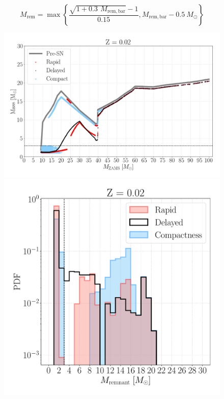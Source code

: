\documentclass[a4paper,titlepage]{book}     	%
\newcommand{\sun}{\ensuremath{_\odot}}
\newcommand{\msun}{\ensuremath{M\sun}}
\begin{document}
\begin{equation}\label{eq:neutrinolosses}
    M_\mathrm{rem} = \max \left\{ \frac{\sqrt{1 + 0.3\,~M_\mathrm{rem, bar}} -1 }{0.15}, M_\mathrm{rem,bar}-0.5~\msun\right\}
\end{equation}




\begin{figure}[t!]
	\begin{minipage}{.60\textwidth}
		\centering
		\includegraphics[width=1.05\textwidth]{./images/remnants_Z02.jpg}
	\end{minipage}
	\hfill
	\begin{minipage}{.39\textwidth}
		\centering
		\includegraphics[width=1.05\textwidth]{./images/hist_Z02.pdf}	

\end{minipage}
\end{figure}
\end{document}
